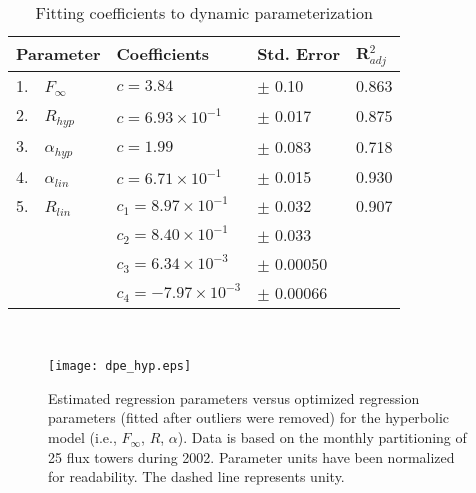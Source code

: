 \begin{table}[h]
    \caption{Fitting coefficients to dynamic parameterization}
    \label{tab:dpe}
    \centering
    \begin{tabular}{l l l l}
    \hline
    \bf{Parameter} & \bf{Coefficients} & \bf{Std. Error} & \bf{R$_{adj}^{2}$}\\
    \hline
    1.~~$F_{\infty}$ & $c = 3.84$                & $\pm$ 0.10  & 0.863 \\
    2.~~$R_{hyp}$    & $c = 6.93 \times 10^{-1}$ & $\pm$ 0.017 & 0.875 \\
    3.~~$\alpha_{hyp}$ & $c = 1.99$                & $\pm$ 0.083 & 0.718 \\
    4.~~$\alpha_{lin}$ & $c = 6.71 \times 10^{-1}$ & $\pm$ 0.015 & 0.930 \\
    5.~~$R_{lin}$  & $c_{1} = 8.97 \times 10^{-1}$  & $\pm$ 0.032 & 0.907 \\
    ~              & $c_{2} = 8.40 \times 10^{-1}$  & $\pm$ 0.033 & ~ \\
    ~              & $c_{3} = 6.34 \times 10^{-3}$  & $\pm$ 0.00050 & ~ \\
    ~              & $c_{4} = -7.97 \times 10^{-3}$ & $\pm$ 0.00066 & ~ \\
    \hline
    \end{tabular}\\
\end{table}

\begin{figure}[h!]
    \texttt{[image: dpe\_hyp.eps]}
    \caption{Estimated regression parameters versus optimized regression 
    parameters (fitted after outliers were removed) for the hyperbolic model 
    (i.e., $F_{\infty}$, $R$, $\alpha$). Data is based on the monthly 
    partitioning of 25 flux towers during 2002. Parameter units have been 
    normalized for readability. The dashed line represents unity.}
    \label{fig:hmodest}
\end{figure}

